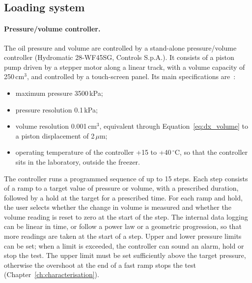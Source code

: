 \subsection{Loading system}
\label{subsec:loading}

\paragraph{Pressure/volume controller.} The oil pressure and volume are controlled by a stand-alone pressure/volume controller (Hydromatic 28-WF45SG, Controls S.p.A.). It consists of a piston pump driven by a stepper motor along a linear track, with a volume capacity of 250\,cm$^3$, and controlled by a touch-screen panel. Its main specifications are~\cite{hydromatic2018}:
\begin{itemize}
    \item maximum pressure 3500\,kPa;
    \item pressure resolution 0.1\,kPa;
    \item volume resolution 0.001\,cm$^3$, equivalent through Equation~\eqref{eq:dx_volume} to a piston displacement of 2\,$\mu$m;
    \item operating temperature of the controller +15 to +40\,$^\circ$C, so that the controller sits in the laboratory, outside the freezer.
\end{itemize}

The controller runs a programmed sequence of up to 15 steps. Each step consists of a ramp to a target value of pressure or volume, with a prescribed duration, followed by a hold at the target for a prescribed time. For each ramp and hold, the user selects whether the change in volume is measured and whether the volume reading is reset to zero at the start of the step. The internal data logging can be linear in time, or follow a power law or a geometric progression, so that more readings are taken at the start of a step. Upper and lower pressure limits can be set; when a limit is exceeded, the controller can sound an alarm, hold or stop the test. The upper limit must be set sufficiently above the target pressure, otherwise the overshoot at the end of a fast ramp stops the test (Chapter~\ref{ch:characterisation}).

